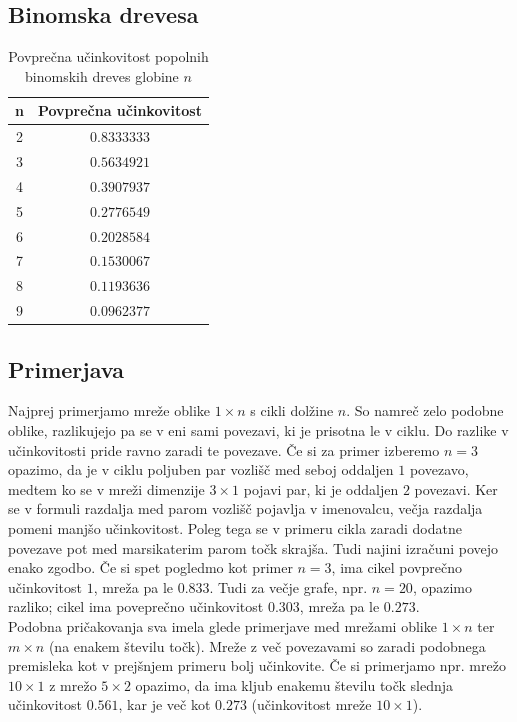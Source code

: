 \documentclass[a4paper, 16pt]{article}
\begin{document}
    \subsection{Binomska drevesa}
    \begin{table}[!h]
        \centering
        \begin{tabular}{c|c}
            n & Povprečna učinkovitost \\ \hline
            2  & $0.8333333$ \\
            3  & $0.5634921$ \\
            4  & $0.3907937$ \\
            5  & $0.2776549$ \\
            6  & $0.2028584$ \\
            7  & $0.1530067$ \\
            8  & $0.1193636$ \\
            9  & $0.0962377$ 

        \end{tabular}
        \caption{Povprečna učinkovitost popolnih binomskih dreves globine $n$}
        \label{table: 5}
    \end{table}

    \subsection{Primerjava}
    Najprej primerjamo mreže oblike $1\times n$ s cikli dolžine $n$. So namreč zelo podobne oblike, 
    razlikujejo pa se v eni sami povezavi, ki je prisotna le v ciklu. Do razlike v učinkovitosti pride
    ravno zaradi te povezave. Če si za primer izberemo $n = 3$ opazimo, da je v ciklu poljuben par vozlišč
    med seboj oddaljen $1$ povezavo, medtem ko se v mreži dimenzije $3\times 1$ pojavi par, ki je oddaljen $2$ povezavi.
    Ker se v formuli razdalja med parom vozlišč pojavlja v imenovalcu, večja razdalja pomeni manjšo učinkovitost.
    Poleg tega se v primeru cikla zaradi dodatne povezave pot med marsikaterim parom točk skrajša. Tudi najini izračuni 
    povejo enako zgodbo. Če si spet pogledmo kot primer $n = 3$, ima cikel povprečno učinkovitost $1$, mreža
    pa le $0.833$. Tudi za večje grafe, npr. $n = 20$, opazimo razliko; cikel ima poveprečno učinkovitost $0.303$, 
    mreža pa le $0.273$.\\

    Podobna pričakovanja sva imela glede primerjave med mrežami oblike $1 \times n$ ter $m \times n$ (na enakem številu točk).
    Mreže z več povezavami so zaradi podobnega premisleka kot v prejšnjem primeru bolj učinkovite. 
    Če si primerjamo npr. mrežo $10 \times 1$ z mrežo $5 \times 2$ opazimo, da ima kljub enakemu številu točk slednja učinkovitost
    $0.561$, kar je več kot $0.273$ (učinkovitost mreže $10 \times 1$).\\
\end{document}
